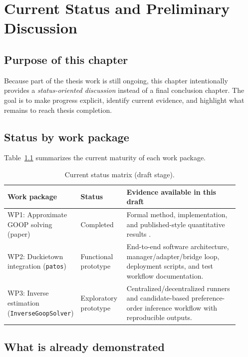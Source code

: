 \chapter{Current Status and Preliminary Discussion}

\section{Purpose of this chapter}

Because part of the thesis work is still ongoing, this chapter intentionally
provides a \emph{status-oriented discussion} instead of a final conclusion
chapter. The goal is to make progress explicit, identify current evidence, and
highlight what remains to reach thesis completion.

\section{Status by work package}

Table~\ref{tab:status_matrix} summarizes the current maturity of each work
package.

\begin{table}[tbp]
\centering
\caption{Current status matrix (draft stage).}
\label{tab:status_matrix}
\begin{tabular}{@{}p{0.22\linewidth}p{0.2\linewidth}p{0.5\linewidth}@{}}
\toprule
Work package & Status & Evidence available in this draft \\
\midrule
WP1: Approximate GOOP solving (paper) & Completed & Formal method, implementation, and published-style quantitative results \cite{delasheras:2025}. \\
WP2: Duckietown integration (\texttt{patos}) & Functional prototype & End-to-end software architecture, manager/adapter/bridge loop, deployment scripts, and test workflow documentation. \\
WP3: Inverse estimation (\texttt{InverseGoopSolver}) & Exploratory prototype & Centralized/decentralized runners and candidate-based preference-order inference workflow with reproducible outputs. \\
\bottomrule
\end{tabular}
\end{table}

\section{What is already demonstrated}


